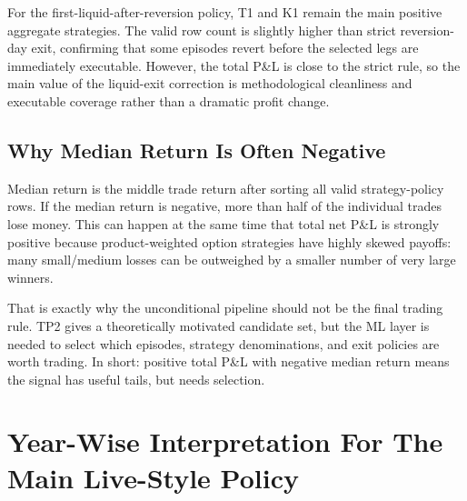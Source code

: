 \documentclass[11pt]{article}
\begin{document}
For the first-liquid-after-reversion policy, T1 and K1 remain the main positive aggregate
strategies. The valid row count is slightly higher than strict reversion-day exit, confirming that
some episodes revert before the selected legs are immediately executable. However, the total P\&L
is close to the strict rule, so the main value of the liquid-exit correction is methodological
cleanliness and executable coverage rather than a dramatic profit change.

\subsection{Why Median Return Is Often Negative}

Median return is the middle trade return after sorting all valid strategy-policy rows. If the median
return is negative, more than half of the individual trades lose money. This can happen at the
same time that total net P\&L is strongly positive because product-weighted option strategies have
highly skewed payoffs: many small/medium losses can be outweighed by a smaller number of very
large winners.

That is exactly why the unconditional pipeline should not be the final trading rule. TP2 gives a
theoretically motivated candidate set, but the ML layer is needed to select which episodes, strategy
denominations, and exit policies are worth trading. In short: positive total P\&L with negative median
return means the signal has useful tails, but needs selection.

\section{Year-Wise Interpretation For The Main Live-Style Policy}
\end{document}
